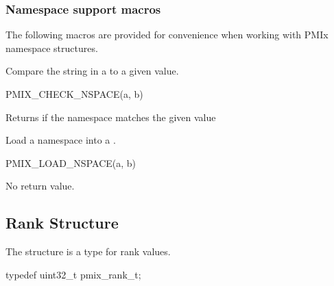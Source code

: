\subsubsection{Namespace support macros}

The following macros are provided for convenience when working with \ac{PMIx} namespace structures.


Compare the string in a  to a given value.

\cspecificstart
\begin{codepar}
PMIX_CHECK_NSPACE(a, b)
\end{codepar}
\cspecificend

\begin{arglist}
\end{arglist}

Returns  if the namespace matches the given value


Load a namespace into a .

\cspecificstart
\begin{codepar}
PMIX_LOAD_NSPACE(a, b)
\end{codepar}
\cspecificend

\begin{arglist}
\end{arglist}

No return value.


\subsection{Rank Structure}

The  structure is a  type for rank values.

\cspecificstart
\begin{codepar}
typedef uint32_t pmix_rank_t;
\end{codepar}
\cspecificend

